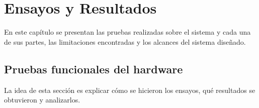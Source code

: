 
\chapter{Ensayos y Resultados} %

\label{Chapter4} %

En este capítulo se presentan las pruebas realizadas sobre el sistema y cada una de sus partes, las limitaciones encontradas y los alcances del sistema diseñado.

\section{Pruebas funcionales del hardware}
\label{sec:pruebasHW}

La idea de esta sección es explicar cómo se hicieron los ensayos, qué resultados se obtuvieron y analizarlos.
